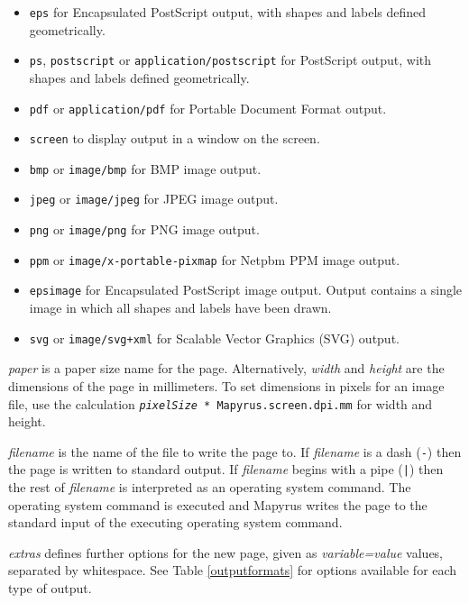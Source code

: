 \begin{itemize}
\item
\texttt{eps} for Encapsulated PostScript output,
with shapes and labels defined geometrically.
\item
\texttt{ps}, \texttt{postscript} or \texttt{application/postscript}
for PostScript output,
with shapes and labels defined geometrically.
\item
\texttt{pdf} or \texttt{application/pdf} for Portable Document
Format output.
\item
\texttt{screen} to display output in a window on the screen.
\item
\texttt{bmp} or \texttt{image/bmp} for BMP image output.
\item
\texttt{jpeg} or \texttt{image/jpeg} for JPEG image output.
\item
\texttt{png} or \texttt{image/png} for PNG image output.
\item
\texttt{ppm} or \texttt{image/x-portable-pixmap} for Netpbm PPM image output.
\item
\texttt{epsimage} for Encapsulated PostScript image output.
Output contains
a single image in which all shapes and labels have been drawn.
\item
\texttt{svg} or \texttt{image/svg+xml} for Scalable Vector Graphics
(SVG) output.
\end{itemize}

\textit{paper} is a paper size name for the page.
Alternatively, \textit{width} and \textit{height} are the dimensions of the page
in millimeters.  To set dimensions in pixels for an image file,
use the calculation
\texttt{\textit{pixelSize} * Mapyrus.screen.dpi.mm} for
width and height.

\textit{filename} is the name of the file to write the page to.
If \textit{filename} is a dash (\texttt{-})
then the page is written to standard output.
If \textit{filename} begins with a pipe (\texttt{|}) then the rest
of \textit{filename} is interpreted as an operating system
command.  The operating system command is executed and Mapyrus
writes the page to the standard input of the executing
operating system command.

\textit{extras} defines further options for the new page, given as
\textit{variable=value} values, separated by whitespace.
See Table \ref{outputformats}
for options available for each type of output.

